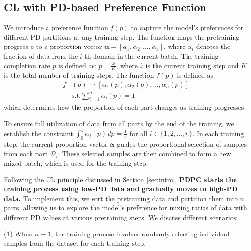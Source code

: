 \documentclass[11pt]{article}
\begin{document}
\subsection{CL with PD-based Preference Function}
\label{sec:2.4}
We introduce a preference function $f(p)$ to capture the model's preferences for different PD partitions at any training step. 
The function maps the pretraining progress \( p \) to a proportion vector \( \boldsymbol{\alpha} = [\alpha_1, \alpha_2, \ldots, \alpha_n] \), where \( \alpha_i \) denotes the fraction of data from the \(i\)-th domain in the current batch. The training completion rate \( p \) is defined as: $p = \frac{k}{K}$, where \( k \) is the current training step and \( K \) is the total number of training steps. The function \( f(p) \) is defined as 
\begin{equation}
\begin{aligned}
    f&(p) \rightarrow [\alpha_1(p), \alpha_2(p), \ldots, \alpha_n(p)]
    \\ &\text{s.t.} \sum_{i=1}^{n} \alpha_i(p) = 1 
\end{aligned}
\end{equation}
which determines how the proportion of each part changes as training progresses.

To ensure full utilization of data from all parts by the end of the training, we establish the constraint \(\int_{0}^{1} \alpha_i(p) \, dp = \frac{1}{n}\) for all \(i \in \{1, 2, \ldots, n\}\). In each training step, the current proportion vector \(\boldsymbol{\alpha}\) guides the proportional selection of samples from each part \(\mathcal{D}_i\). These selected samples are then combined to form a new mixed batch, which is used for the training step.

Following the CL principle discussed in Section \ref{sec:intro}, \textbf{PDPC starts the training process using low-PD data and gradually moves to high-PD data.} To implement this, we sort the pretraining data and partition them into \( n \) parts, allowing us to explore the model's preference for mixing ratios of data with different PD values at various pretraining steps. We discuss different scenarios:

\noindent(1) When \(n=1\), the training process involves randomly selecting individual samples from the dataset for each training step.
    
\end{document}

